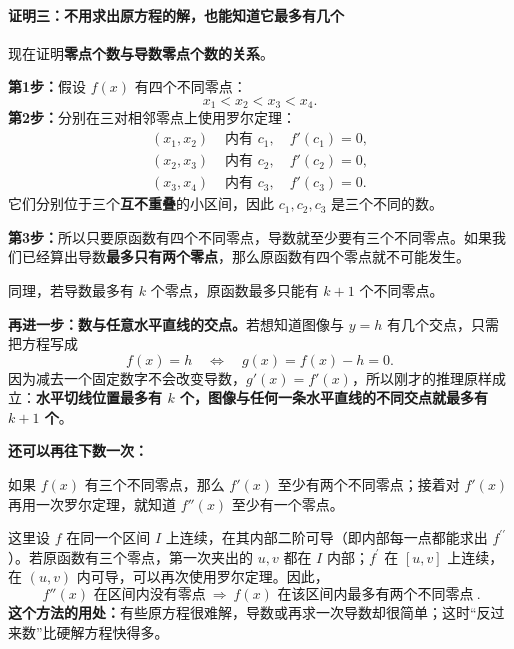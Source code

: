 \begin{proofbox}
\par\medskip
\noindent\begin{minipage}{\linewidth}
\paragraph{证明三：不用求出原方程的解，也能知道它最多有几个}
\begin{center}\end{center}
\end{minipage}\par\medskip

现在证明\textbf{零点个数与导数零点个数的关系}。

\textbf{第1步：}假设 $f(x)$ 有四个不同零点：
\[
x_1<x_2<x_3<x_4.
\]
\textbf{第2步：}分别在三对相邻零点上使用罗尔定理：
\[
\begin{aligned}
(x_1,x_2)&\text{ 内有 }c_1,\quad f'(c_1)=0,\\
(x_2,x_3)&\text{ 内有 }c_2,\quad f'(c_2)=0,\\
(x_3,x_4)&\text{ 内有 }c_3,\quad f'(c_3)=0.
\end{aligned}
\]
它们分别位于三个\textbf{互不重叠}的小区间，因此 $c_1,c_2,c_3$ 是三个不同的数。

\textbf{第3步：}所以只要原函数有四个不同零点，导数就至少要有三个不同零点。如果我们已经算出导数\textbf{最多只有两个零点}，那么原函数有四个零点就不可能发生。

同理，若导数最多有 $k$ 个零点，原函数最多只能有 $k+1$ 个不同零点。

\textbf{再进一步：数与任意水平直线的交点。}若想知道图像与 $y=h$ 有几个交点，只需把方程写成
\[
 f(x)=h\quad\Longleftrightarrow\quad g(x)=f(x)-h=0.
\]
因为减去一个固定数字不会改变导数，$g'(x)=f'(x)$，所以刚才的推理原样成立：\textbf{水平切线位置最多有 $k$ 个，图像与任何一条水平直线的不同交点就最多有 $k+1$ 个}。



\textbf{还可以再往下数一次：}
\begin{center}\end{center}
如果 $f(x)$ 有三个不同零点，那么 $f'(x)$ 至少有两个不同零点；接着对 $f'(x)$ 再用一次罗尔定理，就知道 $f''(x)$ 至少有一个零点。

这里设 $f$ 在同一个区间 $I$ 上连续，在其内部二阶可导（即内部每一点都能求出 $f^{\prime\prime}$）。若原函数有三个零点，第一次夹出的 $u,v$ 都在 $I$ 内部；$f^{\prime}$ 在 $[u,v]$ 上连续，在 $(u,v)$ 内可导，可以再次使用罗尔定理。因此，
\[
\boxed{\ f''(x)\text{ 在区间内没有零点}\ \Longrightarrow\ f(x)\text{ 在该区间内最多有两个不同零点}\ }.
\]
\textbf{这个方法的用处：}有些原方程很难解，导数或再求一次导数却很简单；这时“反过来数”比硬解方程快得多。
\end{proofbox}


